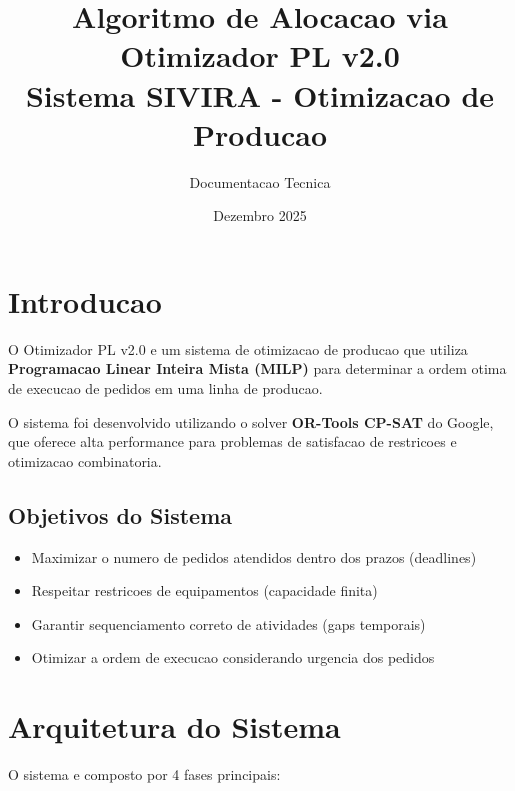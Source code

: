 \documentclass[12pt,a4paper]{article}
\title{\textbf{Algoritmo de Alocacao via Otimizador PL v2.0}\\
\large Sistema SIVIRA - Otimizacao de Producao}
\author{Documentacao Tecnica}
\date{Dezembro 2025}
\begin{document}
\maketitle

\tableofcontents
\newpage

\section{Introducao}

O Otimizador PL v2.0 e um sistema de otimizacao de producao que utiliza \textbf{Programacao Linear Inteira Mista (MILP)} para determinar a ordem otima de execucao de pedidos em uma linha de producao.

O sistema foi desenvolvido utilizando o solver \textbf{OR-Tools CP-SAT} do Google, que oferece alta performance para problemas de satisfacao de restricoes e otimizacao combinatoria.

\subsection{Objetivos do Sistema}

\begin{itemize}
    \item Maximizar o numero de pedidos atendidos dentro dos prazos (deadlines)
    \item Respeitar restricoes de equipamentos (capacidade finita)
    \item Garantir sequenciamento correto de atividades (gaps temporais)
    \item Otimizar a ordem de execucao considerando urgencia dos pedidos
\end{itemize}

\section{Arquitetura do Sistema}

O sistema e composto por 4 fases principais:

\begin{center}
\end{center}
\end{document}
